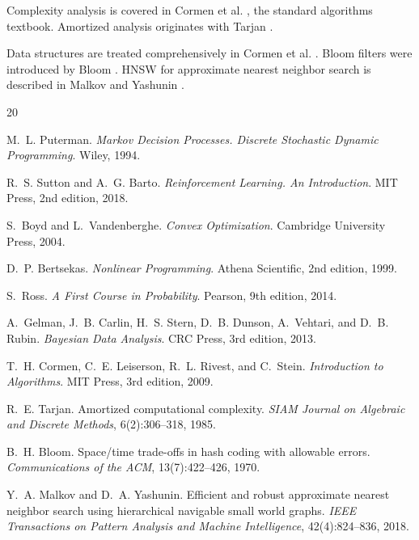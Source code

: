 Complexity analysis is covered in Cormen et al. \cite{cormen2009introduction}, the standard algorithms textbook. Amortized analysis originates with Tarjan \cite{tarjan1985amortized}.

Data structures are treated comprehensively in Cormen et al. \cite{cormen2009introduction}. Bloom filters were introduced by Bloom \cite{bloom1970space}. HNSW for approximate nearest neighbor search is described in Malkov and Yashunin \cite{malkov2018efficient}.

\begin{thebibliography}{20}

M.~L. Puterman.
\newblock \emph{Markov Decision Processes. Discrete Stochastic Dynamic Programming}.
\newblock Wiley, 1994.

R.~S. Sutton and A.~G. Barto.
\newblock \emph{Reinforcement Learning. An Introduction}.
\newblock MIT Press, 2nd edition, 2018.

S.~Boyd and L.~Vandenberghe.
\newblock \emph{Convex Optimization}.
\newblock Cambridge University Press, 2004.

D.~P. Bertsekas.
\newblock \emph{Nonlinear Programming}.
\newblock Athena Scientific, 2nd edition, 1999.

S.~Ross.
\newblock \emph{A First Course in Probability}.
\newblock Pearson, 9th edition, 2014.

A.~Gelman, J.~B. Carlin, H.~S. Stern, D.~B. Dunson, A.~Vehtari, and D.~B. Rubin.
\newblock \emph{Bayesian Data Analysis}.
\newblock CRC Press, 3rd edition, 2013.

T.~H. Cormen, C.~E. Leiserson, R.~L. Rivest, and C.~Stein.
\newblock \emph{Introduction to Algorithms}.
\newblock MIT Press, 3rd edition, 2009.

R.~E. Tarjan.
\newblock Amortized computational complexity.
\newblock \emph{SIAM Journal on Algebraic and Discrete Methods}, 6(2):306--318, 1985.

B.~H. Bloom.
\newblock Space/time trade-offs in hash coding with allowable errors.
\newblock \emph{Communications of the ACM}, 13(7):422--426, 1970.

Y.~A. Malkov and D.~A. Yashunin.
\newblock Efficient and robust approximate nearest neighbor search using hierarchical navigable small world graphs.
\newblock \emph{IEEE Transactions on Pattern Analysis and Machine Intelligence}, 42(4):824--836, 2018.

\end{thebibliography}



